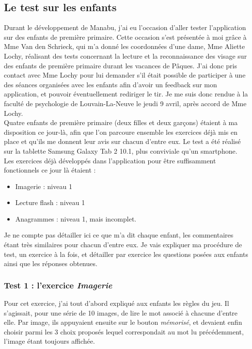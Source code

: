 \subsection{Le test sur les enfants}
Durant le développement de Manabu, j'ai eu l'occasion d'aller tester l'application sur des enfants de première primaire. Cette occasion s'est présentée à moi grâce à Mme Van den Schrieck, qui m'a donné les coordonnées d'une dame, Mme Aliette Lochy, réalisant des tests concernant la lecture et la reconnaissance des visage sur des enfants de première primaire durant les vacances de Pâques. J'ai donc pris contact avec Mme Lochy pour lui demander s'il était possible de participer à une des séances organisées avec les enfants afin d'avoir un feedback sur mon application, et pouvoir éventuellement rediriger le tir. Je me suis donc rendue à la faculté de psychologie de Louvain-La-Neuve le jeudi 9 avril, après accord de Mme Lochy.\\

Quatre enfants de première primaire (deux filles et deux garçons) étaient à ma disposition ce jour-là, afin que l'on parcoure ensemble les exercices déjà mis en place et qu'ils me donnent leur avis sur chacun d'entre eux. Le test a été réalisé sur la tablette Samsung Galaxy Tab 2 10.1, plus conviviale qu'un smartphone. Les exercices déjà développés dans l'application pour être suffisamment fonctionnels ce jour là étaient :
\begin{itemize}
\item Imagerie : niveau 1
\item Lecture flash : niveau 1
\item Anagrammes : niveau 1, mais incomplet.
\end{itemize}
Je ne compte pas détailler ici ce que m'a dit chaque enfant, les commentaires étant très similaires pour chacun d'entre eux. Je vais expliquer ma procédure de test, un exercice à la fois, et détailler par exercice les questions posées aux enfants ainsi que les réponses obtenues.

\subsubsection{Test 1 : l'exercice \textit{Imagerie}}
Pour cet exercice, j'ai tout d'abord expliqué aux enfants les règles du jeu. Il s'agissait, pour une série de 10 images, de lire le mot associé à chacune d'entre elle. Par image, ils appuyaient ensuite sur le bouton \textit{mémorisé}, et devaient enfin choisir parmi les 3 choix proposés lequel correspondait au mot lu précédemment, l'image étant toujours affichée.\\

